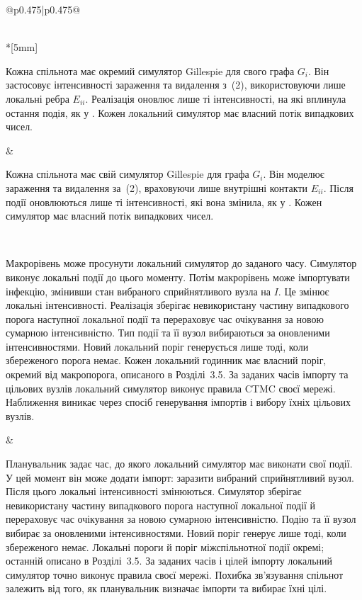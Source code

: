 \documentclass[11pt]{article}
\begin{document}
\begin{longtable}{@{}p{0.475\textwidth}|p{0.475\textwidth}@{}}
\begin{minipage}[t]{\linewidth}
\end{minipage} \\*[5mm]
\begin{minipage}[t]{\linewidth}
Кожна спільнота має окремий симулятор Gillespie для свого графа $G_i$. Він застосовує інтенсивності зараження та видалення з~(2), використовуючи лише локальні ребра $E_{ii}$. Реалізація оновлює лише ті інтенсивності, на які вплинула остання подія, як у \citet{kuryliak2025simulating}. Кожен локальний симулятор має власний потік випадкових чисел.
\end{minipage} &
\begin{minipage}[t]{\linewidth}
Кожна спільнота має свій симулятор Gillespie для графа $G_i$. Він моделює зараження та видалення за~(2), враховуючи лише внутрішні контакти $E_{ii}$. Після події оновлюються лише ті інтенсивності, які вона змінила, як у \citet{kuryliak2025simulating}. Кожен симулятор має власний потік випадкових чисел.
\end{minipage} \\[5mm]
\begin{minipage}[t]{\linewidth}
Макрорівень може просунути локальний симулятор до заданого часу. Симулятор виконує локальні події до цього моменту. Потім макрорівень може імпортувати інфекцію, змінивши стан вибраного сприйнятливого вузла на $I$. Це змінює локальні інтенсивності. Реалізація зберігає невикористану частину випадкового порога наступної локальної події та перераховує час очікування за новою сумарною інтенсивністю. Тип події та її вузол вибираються за оновленими інтенсивностями. Новий локальний поріг генерується лише тоді, коли збереженого порога немає. Кожен локальний годинник має власний поріг, окремий від макропорога, описаного в Розділі~3.5. За заданих часів імпорту та цільових вузлів локальний симулятор виконує правила CTMC своєї мережі. Наближення виникає через спосіб генерування імпортів і вибору їхніх цільових вузлів.
\end{minipage} &
\begin{minipage}[t]{\linewidth}
Планувальник задає час, до якого локальний симулятор має виконати свої події. У цей момент він може додати імпорт: заразити вибраний сприйнятливий вузол. Після цього локальні інтенсивності змінюються. Симулятор зберігає невикористану частину випадкового порога наступної локальної події й перераховує час очікування за новою сумарною інтенсивністю. Подію та її вузол вибирає за оновленими інтенсивностями. Новий поріг генерує лише тоді, коли збереженого немає. Локальні пороги й поріг міжспільнотної події окремі; останній описано в Розділі~3.5. За заданих часів і цілей імпорту локальний симулятор точно виконує правила своєї мережі. Похибка зв'язування спільнот залежить від того, як планувальник визначає імпорти та вибирає їхні цілі.
\end{minipage} \\[5mm]
\begin{minipage}[t]{\linewidth}

\end{minipage}
\end{longtable}
\end{document}
